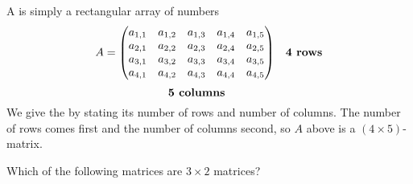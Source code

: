 \documentclass{ximera}
\begin{document}
A  is simply a rectangular array of numbers
\[
  A =
  \underset{\raisebox{-2ex}{\text{\bf 5 columns}}}{
    \begin{pmatrix}
      a_{1,1} & a_{1,2} & a_{1,3} & a_{1,4} & a_{1,5} \\
      a_{2,1} & a_{2,2} & a_{2,3} & a_{2,4} & a_{2,5} \\
      a_{3,1} & a_{3,2} & a_{3,3} & a_{3,4} & a_{3,5} \\
      a_{4,1} & a_{4,2} & a_{4,3} & a_{4,4} & a_{4,5}
    \end{pmatrix}}
  \quad\text{\bf 4 rows}
\]
We give the  by stating its number of rows
and number of columns. The number of rows comes first and the number
of columns second, so $A$ above is a $(4\times 5)$-matrix.
\begin{question}
  Which of the following matrices are $3\times 2$ matrices?
  \begin{selectAll}
\pdfOnly{\end{multicols}}
\end{selectAll}
\end{question}


\end{document}
